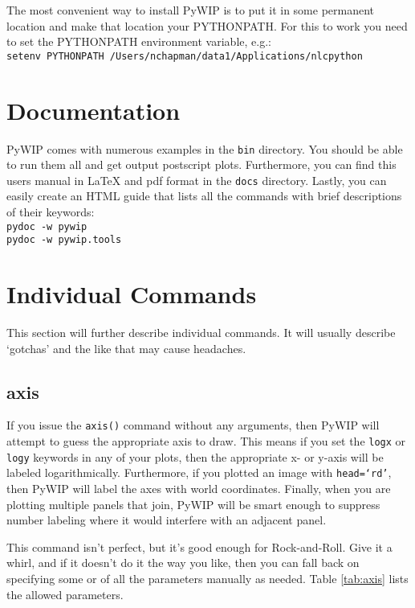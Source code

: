 \documentclass[12pt]{article}
\newcommand{\pywip}{PyWIP}
\begin{document}
The most convenient way to install \pywip{} is to put it in some permanent
location and make that location your PYTHONPATH.  For this to work
you need to set the PYTHONPATH environment variable, e.g.:\\ \texttt{setenv
PYTHONPATH /Users/nchapman/data1/Applications/nlcpython}

\section{Documentation}

\pywip{} comes with numerous examples in the \texttt{bin} directory. You should
be able to run them all and get output postscript plots.  Furthermore, you can
find this users manual in \LaTeX{} and pdf format in the \texttt{docs}
directory.  Lastly, you can easily create an HTML guide that lists all the
commands with brief descriptions of their keywords:\\
\texttt{pydoc -w pywip}\\
\texttt{pydoc -w pywip.tools}

\section{Individual Commands}

This section will further describe individual commands.  It will usually 
describe `gotchas' and the like that may cause headaches.

\subsection{axis}

If you issue the \texttt{axis()} command without any arguments, then \pywip{}
will attempt to guess the appropriate axis to draw.  This means if you set
the \texttt{logx} or \texttt{logy} keywords in any of your plots, then the
appropriate x- or y-axis will be labeled logarithmically.  Furthermore,
if you plotted an image with \texttt{head=`rd'}, then \pywip{} will label
the axes with world coordinates.  Finally, when you are plotting multiple
panels that join, \pywip{} will be smart enough to suppress number labeling
where it would interfere with an adjacent panel.

This command isn't perfect, but it's good enough for Rock-and-Roll.  Give it a
whirl, and if it doesn't do it the way you like, then you can fall back on
specifying some or of all the parameters manually as needed.  Table
\ref{tab:axis} lists the allowed parameters.
\end{document}
